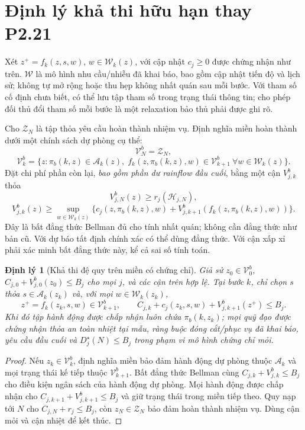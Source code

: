 \documentclass[11pt,a4paper]{article}
\newtheorem{theorem}{Định lý}
\begin{document}
\section{Định lý khả thi hữu hạn thay P2.21}
Xét $z^+=f_k(z,s,w)$, $w\in\mathcal W_k(z)$, với cập nhật $c_j\ge0$ được chứng nhận như trên. $\mathcal W$ là mô hình nhu cầu/nhiễu đã khai báo, bao gồm cập nhật tiến độ và lịch sử; không tự mở rộng hoặc thu hẹp không nhất quán sau mỗi bước. Với tham số cố định chưa biết, có thể lưu tập tham số trong trạng thái thông tin; cho phép đối thủ đổi tham số mỗi bước là một relaxation bảo thủ phải được ghi rõ.

Cho $\mathcal Z_N$ là tập thỏa yêu cầu hoàn thành nhiệm vụ. Định nghĩa miền hoàn thành dưới một chính sách dự phòng cụ thể:
\[
\mathcal V_N^b=\mathcal Z_N,
\]
\[
\mathcal V_k^b=\{z:\pi_b(k,z)\in\mathcal A_k(z),\;
f_k(z,\pi_b(k,z),w)\in\mathcal V_{k+1}^b\ \forall w\in\mathcal W_k(z)\}.
\]
Đặt chi phí phần còn lại, \emph{bao gồm phần dư rainflow đầu cuối}, bằng một cận $V_{j,k}^b$ thỏa
\[
V_{j,N}^b(z)\ge r_j(\mathcal H_{j,N}),
\]
\[
V_{j,k}^b(z)\ge\sup_{w\in\mathcal W_k(z)}
\{c_j(z,\pi_b(k,z),w)+V_{j,k+1}^b(f_k(z,\pi_b(k,z),w))\}.
\]
Đây là bất đẳng thức Bellman đủ cho tính nhất quán; không cần đẳng thức như bản cũ. Với dự báo tất định chính xác có thể dùng đẳng thức. Với cận xấp xỉ phải xác minh bất đẳng thức này, kể cả sai số tính toán.

\begin{theorem}[Khả thi đệ quy trên miền có chứng chỉ]
Giả sử $z_0\in\mathcal V_0^b$, $C_{j,0}+V_{j,0}^b(z_0)\le B_j$ cho mọi $j$, và các cận trên hợp lệ. Tại bước $k$, chỉ chọn $s$ thỏa $s\in\mathcal A_k(z_k)$ và, với mọi $w\in\mathcal W_k(z_k)$,
\[
z^+=f_k(z_k,s,w)\in\mathcal V_{k+1}^b,
\qquad C_{j,k}+c_j(z_k,s,w)+V_{j,k+1}^b(z^+)\le B_j.
\]
Khi đó tập hành động được chấp nhận luôn chứa $\pi_b(k,z_k)$; mọi quỹ đạo được chứng nhận thỏa an toàn nhiệt tại mẫu, ràng buộc đóng cắt/phục vụ đã khai báo, yêu cầu đầu cuối và $D_j^\star(N)\le B_j$ trong phạm vi mô hình chứng chỉ mỏi.
\end{theorem}
\begin{proof}
Nếu $z_k\in\mathcal V_k^b$, định nghĩa miền bảo đảm hành động dự phòng thuộc $\mathcal A_k$ và mọi trạng thái kế tiếp thuộc $\mathcal V_{k+1}^b$. Bất đẳng thức Bellman cùng $C_{j,k}+V_{j,k}^b\le B_j$ cho điều kiện ngân sách của hành động dự phòng. Mọi hành động được chấp nhận cho $C_{j,k+1}+V_{j,k+1}^b\le B_j$ và giữ trạng thái trong miền tiếp theo. Quy nạp tới $N$ cho $C_{j,N}+r_j\le B_j$, còn $z_N\in\mathcal Z_N$ bảo đảm hoàn thành nhiệm vụ. Dùng cận mỏi và cận nhiệt để kết thúc.
\end{proof}
\end{document}
